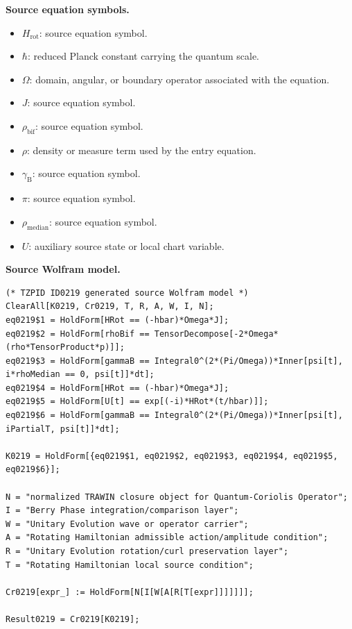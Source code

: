 \begin{minipage}[t]{0.49\linewidth}
\begingroup
\small
\raggedright
\textbf{Source equation symbols.}\par
\begin{itemize}[leftmargin=1.35em,itemsep=1pt,topsep=1pt,parsep=0pt]
    \item $H_{\mathrm{rot}}$: source equation symbol.
    \item $\hbar$: reduced Planck constant carrying the quantum scale.
    \item $\Omega$: domain, angular, or boundary operator associated with the equation.
    \item $J$: source equation symbol.
    \item $\rho_{\mathrm{bif}}$: source equation symbol.
    \item $\rho$: density or measure term used by the entry equation.
    \item $\gamma_{\mathrm{B}}$: source equation symbol.
    \item $\pi$: source equation symbol.
    \item $\rho_{\mathrm{median}}$: source equation symbol.
    \item $U$: auxiliary source state or local chart variable.
\end{itemize}
\endgroup
\end{minipage}\hfill
\begin{minipage}[t]{0.47\linewidth}
\begingroup
\scriptsize
\raggedright
\textbf{Source Wolfram model.}\par
\begin{Verbatim}[fontsize=\tiny,breaklines=true,breakanywhere=true]
(* TZPID ID0219 generated source Wolfram model *)
ClearAll[K0219, Cr0219, T, R, A, W, I, N];
eq0219$1 = HoldForm[HRot == (-hbar)*Omega*J];
eq0219$2 = HoldForm[rhoBif == TensorDecompose[-2*Omega*(rho*TensorProduct*p)]];
eq0219$3 = HoldForm[gammaB == Integral0^(2*(Pi/Omega))*Inner[psi[t], i*rhoMedian == 0, psi[t]]*dt];
eq0219$4 = HoldForm[HRot == (-hbar)*Omega*J];
eq0219$5 = HoldForm[U[t] == exp[(-i)*HRot*(t/hbar)]];
eq0219$6 = HoldForm[gammaB == Integral0^(2*(Pi/Omega))*Inner[psi[t], iPartialT, psi[t]]*dt];

K0219 = HoldForm[{eq0219$1, eq0219$2, eq0219$3, eq0219$4, eq0219$5, eq0219$6}];

N = "normalized TRAWIN closure object for Quantum-Coriolis Operator";
I = "Berry Phase integration/comparison layer";
W = "Unitary Evolution wave or operator carrier";
A = "Rotating Hamiltonian admissible action/amplitude condition";
R = "Unitary Evolution rotation/curl preservation layer";
T = "Rotating Hamiltonian local source condition";

Cr0219[expr_] := HoldForm[N[I[W[A[R[T[expr]]]]]]];

Result0219 = Cr0219[K0219];
\end{Verbatim}
\endgroup
\end{minipage}

